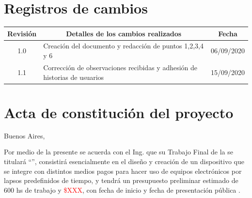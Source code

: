 \documentclass[11pt]{charter}
\begin{document}
\maketitle
\thispagestyle{empty}
\pagebreak


\thispagestyle{empty}
{\setlength{\parskip}{0pt}
\tableofcontents{}
}
\pagebreak


\section{Registros de cambios}
\label{sec:registro}


\begin{table}[ht]
\label{tab:registro}
\centering
\begin{tabularx}{\linewidth}{@{}|c|X|c|@{}}
\hline
\rowcolor[HTML]{C0C0C0} 
Revisión & \multicolumn{1}{c|}{\cellcolor[HTML]{C0C0C0}Detalles de los cambios realizados} & Fecha      \\ \hline
1.0      & Creación del documento y redacción de puntos 1,2,3,4 y 6  & 06/09/2020 \\ \hline
1.1      & Corrección de observaciones recibidas y adhesión de historias de usuarios                                                                 & 15/09/2020 \\ \hline
\end{tabularx}
\end{table}

\pagebreak



\section{Acta de constitución del proyecto}
\label{sec:acta}

\begin{flushright}
Buenos Aires, \fechaInicioName
\end{flushright}

\vspace{2cm}

Por medio de la presente se acuerda con el Ing. \authorname\hspace{1px} que su Trabajo Final de la \degreename\hspace{1px} se titulará ``\ttitle'', consistirá esencialmente en el diseño y creación de un dispositivo que se integre con distintos medios pagos para hacer uso de equipos electrónicos por lapsos predefinidos de tiempo, y tendrá un presupuesto preliminar estimado de 600 hs de trabajo y \textcolor{red}{\$XXX}, con fecha de inicio \fechaInicioName\hspace{1px} y fecha de presentación pública \fechaFinalName.
\end{document}
